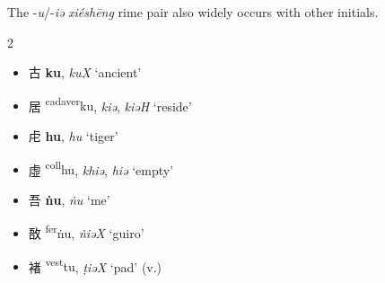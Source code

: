The -\textit{u}/-\textit{iə} \textit{xiéshēng} rime pair also widely occurs with other initials.  

\begin{multicols}{2}
\raggedcolumns
\begin{itemize}
    \item {\Large{古}} %
    {\large{\textbf{ku}}},
    \textit{kuX} %
    `ancient'

    \item {\Large{居}} %
    {\large{{\textsuperscript{cadaver}ku}}},
    \textit{kiə}, \textit{kiəH} %
    `reside'
\end{itemize}

\vspace{3mm}

\begin{minipage}{\columnwidth}
\begin{itemize}[leftmargin=*, labelsep=0.5em]
    \item {\Large{虍}} %
    {\large{\textbf{hu}}},
    \textit{hu} %
    `tiger'

    \item {\Large{虛}} %
    {\large{{\textsuperscript{coll}hu}}},
    \textit{khiə}, \textit{hiə} %
    `empty'
\end{itemize}
\end{minipage}

\vspace{5mm}


\begin{minipage}{\columnwidth}
\begin{itemize}[leftmargin=*, labelsep=0.5em]
    \item {\Large{吾}} %
    {\large{\textbf{ṅu}}},
    \textit{ṅu} %
    `me'

    \item {\Large{敔}} %
    {\large{{\textsuperscript{fer}ṅu}}},
    \textit{ṅiəX} %
    `guiro'
\end{itemize}
\end{minipage}

\vspace{6mm}

\begin{minipage}{\columnwidth}
\begin{itemize}[leftmargin=*, labelsep=0.5em]
    \item {\Large{褚}} %
    {\large{{\textsuperscript{vest}tu}}},
    \textit{ṭiəX} %
    `pad' (v.)


\end{itemize}
\end{minipage}
\end{multicols}
